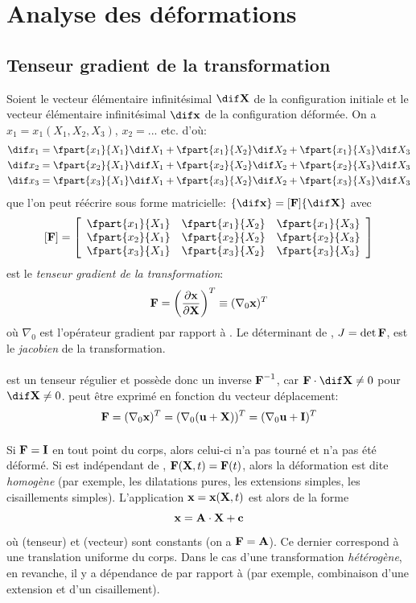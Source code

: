 \section{Analyse des déformations}
\subsection{Tenseur gradient de la transformation}
Soient le vecteur élémentaire infinitésimal $\dif\fv{X}$ de la configuration initiale et le vecteur élémentaire infinitésimal $\dif\fv{x}$ de la configuration déformée. On a $x_1=x_1(X_1, X_2, X_3)$, $x_2=...$ etc. d'où:
\begin{align*}
  \dif x_1&=\fpart{x_1}{X_1}\dif X_1+\fpart{x_1}{X_2}\dif X_2+\fpart{x_1}{X_3}\dif X_3\\
  \dif x_2&=\fpart{x_2}{X_1}\dif X_1+\fpart{x_2}{X_2}\dif X_2+\fpart{x_2}{X_3}\dif X_3\\
  \dif x_3&=\fpart{x_3}{X_1}\dif X_1+\fpart{x_3}{X_2}\dif X_2+\fpart{x_3}{X_3}\dif X_3\\
\end{align*}
que l'on peut réécrire sous forme matricielle: $\{\dif\fv{x}\}=[\fv{F}]\{\dif\fv{X}\}$ avec
$$[\fv{F}]=\left[\begin{array}{ccc}
    \fpart{x_1}{X_1}&\fpart{x_1}{X_2}&\fpart{x_1}{X_3}\\
    \fpart{x_2}{X_1}&\fpart{x_2}{X_2}&\fpart{x_2}{X_3}\\
    \fpart{x_3}{X_1}&\fpart{x_3}{X_2}&\fpart{x_3}{X_3}
\end{array}\right]$$
 est le \emph{tenseur gradient de la transformation}:
$$\textbf{F}=\left(\frac{\partial \textbf{x}}{\partial \textbf{X}}\right)^T\equiv (\nabla_0\textbf{x})^T$$
où $\nabla_0$ est l'opérateur gradient par rapport à .
Le déterminant de , $J=\det \textbf{F}$, est le \emph{jacobien} de la transformation.
\paragraph{}
 est un tenseur régulier et possède donc un inverse $\textbf{F}^{-1}$, car $\fv{F}\cdot \dif\fv{X}\neq 0$ pour $\dif\fv{X} \neq 0$.
 peut être exprimé en fonction du vecteur déplacement:
$$\textbf{F}=(\nabla_0 \textbf{x})^T=(\nabla_0 (\textbf{u}+\textbf{X}))^T=(\nabla_0 \textbf{u}+\textbf{I})^T$$

\paragraph{}
Si $\textbf{F}=\textbf{I}$ en tout point du corps, alors celui-ci n'a pas tourné et n'a pas été déformé. Si  est indépendant de , $\textbf{F}(\textbf{X},t)=\textbf{F}(t)$, alors la déformation est dite \emph{homogène} (par exemple, les dilatations pures, les extensions simples, les cisaillements simples). L'application $\textbf{x}=\textbf{x}(\textbf{X},t)$ est alors de la forme $$\textbf{x}=\textbf{A}\cdot\textbf{X}+\textbf{c}$$ où  (tenseur) et  (vecteur) sont constants (on a $\textbf{F}=\textbf{A}$). Ce dernier correspond à une translation uniforme du corps. Dans le cas d'une transformation \emph{hétérogène}, en revanche, il y a dépendance de  par rapport à  (par exemple, combinaison d'une extension et d'un cisaillement).
